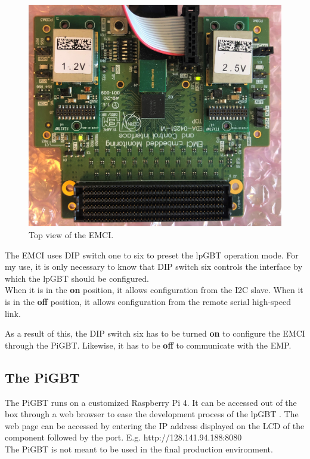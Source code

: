 \begin{figure}[H]
    \centering
    \includegraphics[width=.85\textwidth]{Graphics/EMCI.jpg}
    \caption{Top view of the EMCI.}
    \label{fig:EMP_start}
\end{figure}

\noindent The EMCI uses DIP switch one to six to preset the lpGBT operation mode. For my use, it is only necessary to know that DIP switch six controls the interface by which the lpGBT should be configured. \\

\noindent When it is in the \textbf{on} position, it allows configuration from the I2C slave. When it is in the \textbf{off} position, it allows configuration from the remote serial high-speed link.

\noindent As a result of this, the DIP switch six has to be turned \textbf{on} to configure the EMCI through the PiGBT. Likewise, it has to be \textbf{off} to communicate with the EMP. \newpage

\subsection{The PiGBT}
The PiGBT runs on a customized Raspberry Pi 4. It can be accessed out of the box through a web browser to ease the development process of the lpGBT \cite{VLDBcont6:online}. The web page can be accessed by entering the IP address displayed on the LCD of the component followed by the port. E.g. http://128.141.94.188:8080\\

\noindent The PiGBT is not meant to be used in the final production environment. 

